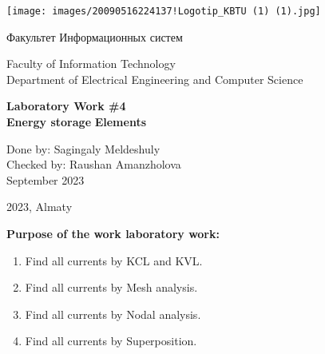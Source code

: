 \documentclass{article}
\begin{document}
\begin{titlepage}
    \centering
    \texttt{[image: images/20090516224137!Logotip\_KBTU (1) (1).jpg]}
    
    \vspace{0cm} %
    {\fontsize{40}{48}\selectfont Факультет Информационных систем} %
    
    \vspace{0.1cm} %
    
    \begin{center} %
        Faculty of Information Technology\\
        Department of Electrical Engineering and Computer Science
    \end{center}
    
    \vfill %
    
    {\LARGE\bfseries Laboratory Work \#4}\\
    {\LARGE\bfseries Energy storage}
    {\LARGE\bfseries Elements}
    \vspace{4cm} %
    
    \begin{flushright}
        Done by: Sagingaly Meldeshuly \\
        Checked by: Raushan Amanzholova \\
        September 2023
    \end{flushright}
    
    \vfill %
    \begin{center}
        2023, Almaty
    \end{center}
    
\end{titlepage}



\begin{flushleft}
\textbf{Purpose of the work laboratory work:}
\end{flushleft}
\begin{enumerate}
    \item Find all currents by KCL and KVL.
    \item Find all currents by Mesh analysis.
    \item Find all currents by Nodal analysis.
    \item Find all currents by Superposition.
\end{enumerate}
\end{document}
